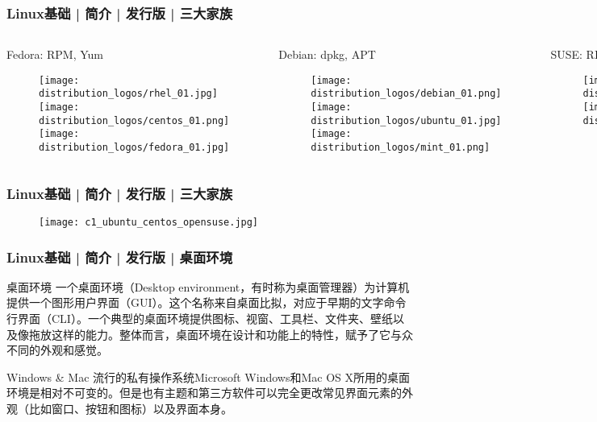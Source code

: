 \begin{frame}
  \frametitle{Linux基础 | 简介 | 发行版 | \alert{三大家族}}
  \begin{columns}
    \begin{block}{Fedora: RPM, Yum}
      \begin{figure}
        \centering
        \texttt{[image: distribution\_logos/rhel\_01.jpg]}\\
        \texttt{[image: distribution\_logos/centos\_01.png]}\\
        \texttt{[image: distribution\_logos/fedora\_01.jpg]}
      \end{figure}
    \end{block}
    \begin{block}{Debian: dpkg, APT}
      \begin{figure}
        \centering
        \texttt{[image: distribution\_logos/debian\_01.png]}\\
        \texttt{[image: distribution\_logos/ubuntu\_01.jpg]}\\
        \texttt{[image: distribution\_logos/mint\_01.png]}
      \end{figure}
    \end{block}
    \begin{block}{SUSE: RPM, Zypper}
      \begin{figure}
        \centering
        \texttt{[image: distribution\_logos/suse\_01.jpg]}\\
	\vspace{0.5cm}
        \texttt{[image: distribution\_logos/opensuse\_01.jpg]}
      \end{figure}
    \end{block}
  \end{columns}
\end{frame}

\begin{frame}
  \frametitle{Linux基础 | 简介 | 发行版 | \alert{三大家族}}
  \begin{figure}
    \centering
    \texttt{[image: c1\_ubuntu\_centos\_opensuse.jpg]}
  \end{figure}
\end{frame}

\begin{frame}
  \frametitle{Linux基础 | 简介 | 发行版 | 桌面环境}
  \begin{block}{桌面环境}
    一个桌面环境（Desktop environment，有时称为桌面管理器）为计算机提供一个图形用户界面（GUI）。这个名称来自桌面比拟，对应于早期的文字命令行界面（CLI）。一个典型的桌面环境提供图标、视窗、工具栏、文件夹、壁纸以及像拖放这样的能力。整体而言，桌面环境在设计和功能上的特性，赋予了它与众不同的外观和感觉。
  \end{block}
  \pause
  \begin{block}{Windows \& Mac}
    流行的私有操作系统Microsoft Windows和Mac OS X所用的桌面环境是相对不可变的。但是也有主题和第三方软件可以完全更改常见界面元素的外观（比如窗口、按钮和图标）以及界面本身。
  \end{block}
\end{frame}


